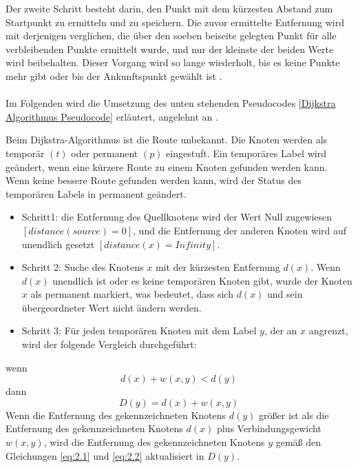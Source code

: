 Der zweite Schritt besteht darin, den Punkt mit dem kürzesten Abstand zum Startpunkt zu ermitteln und zu speichern. Die zuvor ermittelte 
Entfernung wird mit derjenigen verglichen, die über den soeben beiseite gelegten Punkt für alle verbleibenden Punkte 
ermittelt wurde, und nur der kleinste der beiden Werte wird beibehalten. Dieser Vorgang wird so lange wiederholt, bis es keine Punkte
mehr gibt oder bis der Ankunftspunkt gewählt ist \cite{Zhou:19}.
\\ \\
Im Folgenden wird die Umsetzung des unten stehenden Pseudocodes  \ref{Dijkstra Algorithmus Pseudocode} erläutert, angelehnt an \cite{Abusalim2020}.

Beim Dijkstra-Algorithmus ist die Route unbekannt. Die Knoten werden als temporär $(t)$ oder permanent $(p)$ eingestuft.
Ein temporäres Label wird geändert, wenn eine kürzere Route zu einem Knoten gefunden werden kann. Wenn keine bessere Route gefunden werden kann, wird der Status des temporären Labels in permanent geändert.
\begin{itemize}
	\item Schritt1: die Entfernung des Quellknotens wird der Wert Null zugewiesen $[distance (source) = 0]$, und die Entfernung der anderen
		Knoten wird auf unendlich gesetzt $[distance(x) = Infinity]$.
	\item Schritt 2: Suche des Knotens $x$ mit der kürzesten Entfernung $d(x)$. Wenn $d(x)$ unendlich ist oder es keine temporären Knoten gibt,
		wurde der Knoten $x$ als permanent markiert, was bedeutet, dass sich $d(x)$ und sein übergeordneter Wert nicht ändern werden.
	\item Schritt 3: Für jeden temporären Knoten mit dem Label $y$, der an $x$ angrenzt, wird der folgende Vergleich durchgeführt:

	
\end{itemize}
wenn
\begin{equation} \label{eq:2.1}
	d(x) + w (x, y) < d(y)	
\end{equation}
dann
\begin{equation} \label{eq:2.2}
	D(y) = d(x) + w (x, y)
\end{equation}
\newline
Wenn die Entfernung des gekennzeichneten Knotens $d(y)$ größer ist als die Entfernung des gekennzeichneten Knotens $d(x)$ plus Verbindungsgewicht $w(x, y)$, 
wird die Entfernung des gekennzeichneten Knotens $y$ gemäß den Gleichungen \ref{eq:2.1} und \ref{eq:2.2} aktualisiert in $D(y)$.

